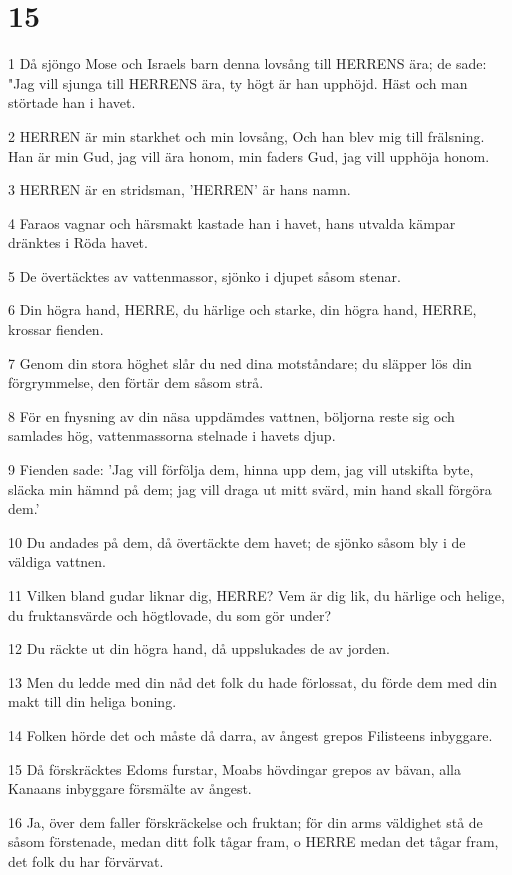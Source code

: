 \chapter{15}

\par 1 Då sjöngo Mose och Israels barn denna lovsång till HERRENS ära; de sade: "Jag vill sjunga till HERRENS ära, ty högt är han upphöjd. Häst och man störtade han i havet.
\par 2 HERREN är min starkhet och min lovsång, Och han blev mig till frälsning. Han är min Gud, jag vill ära honom, min faders Gud, jag vill upphöja honom.
\par 3 HERREN är en stridsman, 'HERREN' är hans namn.
\par 4 Faraos vagnar och härsmakt kastade han i havet, hans utvalda kämpar dränktes i Röda havet.
\par 5 De övertäcktes av vattenmassor, sjönko i djupet såsom stenar.
\par 6 Din högra hand, HERRE, du härlige och starke, din högra hand, HERRE, krossar fienden.
\par 7 Genom din stora höghet slår du ned dina motståndare; du släpper lös din förgrymmelse, den förtär dem såsom strå.
\par 8 För en fnysning av din näsa uppdämdes vattnen, böljorna reste sig och samlades hög, vattenmassorna stelnade i havets djup.
\par 9 Fienden sade: 'Jag vill förfölja dem, hinna upp dem, jag vill utskifta byte, släcka min hämnd på dem; jag vill draga ut mitt svärd, min hand skall förgöra dem.'
\par 10 Du andades på dem, då övertäckte dem havet; de sjönko såsom bly i de väldiga vattnen.
\par 11 Vilken bland gudar liknar dig, HERRE? Vem är dig lik, du härlige och helige, du fruktansvärde och högtlovade, du som gör under?
\par 12 Du räckte ut din högra hand, då uppslukades de av jorden.
\par 13 Men du ledde med din nåd det folk du hade förlossat, du förde dem med din makt till din heliga boning.
\par 14 Folken hörde det och måste då darra, av ångest grepos Filisteens inbyggare.
\par 15 Då förskräcktes Edoms furstar, Moabs hövdingar grepos av bävan, alla Kanaans inbyggare försmälte av ångest.
\par 16 Ja, över dem faller förskräckelse och fruktan; för din arms väldighet stå de såsom förstenade, medan ditt folk tågar fram, o HERRE medan det tågar fram, det folk du har förvärvat.

